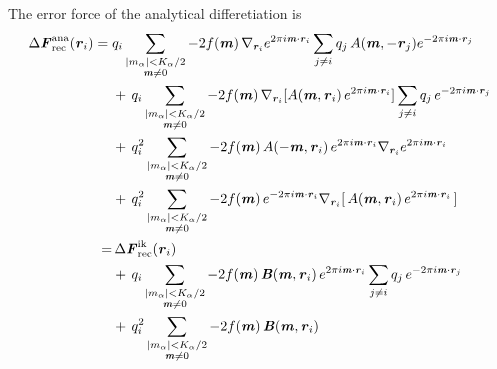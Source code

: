 \documentclass[aps,pre,preprint]{revtex4}
\renewcommand{\v}[1]{\textbf{\textit{#1}}}
\begin{document}
The error force of the analytical differetiation is 
\begin{align}\nonumber
  \Delta\v F_{\textrm{rec}}^{\textrm{ana}}(\v r_i)
  =\;&
  q_i
  \sum_{
    \begin{subarray}{c}
      \vert m_{\alpha}\vert < K_\alpha/2\\
      \v m\neq 0
    \end{subarray}}
  -2f(\v m)\,
  \nabla_{\v r_i}
  e^{2\pi i\v m\cdot \v r_i}
  \sum_{j\neq i}q_j\,
  A(\v m, -\v r_j)
  e^{-2\pi i\v m\cdot\v r_j} \\\nonumber
  & +\,
  q_i
  \sum_{
    \begin{subarray}{c}
      \vert m_{\alpha}\vert < K_\alpha/2\\
      \v m\neq 0
    \end{subarray}}
  -2f(\v m)\,
  \nabla_{\v r_i}
  [A(\v m, \v r_i)\,
  e^{2\pi i\v m\cdot \v r_i} ]
  \sum_{j\neq i}q_j\,
  e^{-2\pi i\v m\cdot\v r_j} \\\nonumber
  & +\,
  q^2_i
  \sum_{
    \begin{subarray}{c}
      \vert m_{\alpha}\vert < K_\alpha/2\\\nonumber
      \v m\neq 0
    \end{subarray}}
  -2f(\v m)\,
  A(-\v m, \v r_i)\,e^{2\pi i\v m\cdot \v r_i} \nabla_{\v r_i}e^{2\pi i\v m\cdot\v r_i} \\
  & +\,
  q^2_i
  \sum_{
    \begin{subarray}{c}
      \vert m_{\alpha}\vert < K_\alpha/2\\
      \v m\neq 0
    \end{subarray}}
  -2f(\v m)\,
  e^{-2\pi i\v m\cdot \v r_i}
  \nabla_{\v r_i} [\,A(\v m, \v r_i) \,e^{2\pi i\v m\cdot\v r_i}\,]  \\\nonumber
  =&\,
  \Delta\v F_{\textrm{rec}}^{\textrm{ik}}(\v r_i)\\\nonumber
  & +\,
  q_i
  \sum_{
    \begin{subarray}{c}
      \vert m_{\alpha}\vert < K_\alpha/2\\
      \v m\neq 0
    \end{subarray}}
  -2f(\v m)\,
  \v B(\v m, \v r_i)\,e^{2\pi i\v m\cdot \v r_i}
  \sum_{j\neq i}q_j\,
  e^{-2\pi i\v m\cdot\v r_j} \\\label{eqn:ana.error.force}
  & +\,
  q^2_i
  \sum_{
    \begin{subarray}{c}
      \vert m_{\alpha}\vert < K_\alpha/2\\
      \v m\neq 0
    \end{subarray}}
  -2f(\v m)\,\v B(\v m, \v r_i) 
\end{align}
\end{document}
